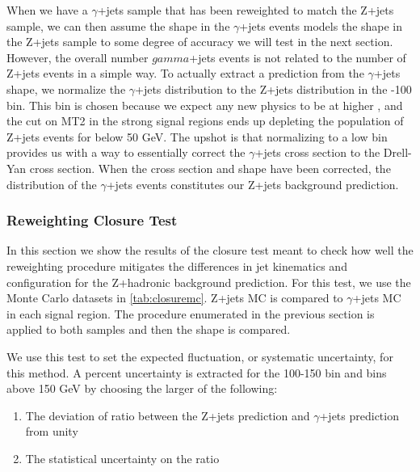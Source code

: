     When we have a $\gamma$+jets sample that has been \pt reweighted to match the Z+jets sample, we can then assume the \MET shape in the $\gamma$+jets events models the \MET shape in the Z+jets sample to some degree of accuracy we will test in the next section. However, the overall number $gamma$+jets events is not related to the number of Z+jets events in a simple way. To actually extract a prediction from the $\gamma$+jets \MET shape, we normalize the $\gamma$+jets \MET distribution to the Z+jets distribution in the -100 bin. This bin is chosen because we expect any new physics to be at higher \MET, and the cut on MT2 in the strong signal regions ends up depleting the population of Z+jets events for \MET below 50 GeV. The upshot is that normalizing to a low \MET bin provides us with a way to essentially correct the $\gamma$+jets cross section to the Drell-Yan cross section. When the cross section and \pt shape have been corrected, the \MET distribution of the $\gamma$+jets events constitutes our Z+jets background prediction.


    \subsubsection{\pt Reweighting Closure Test} \label{sec:pt_reweighting_closure_test}
      In this section we show the results of the closure test meant to check how well the \pt reweighting procedure mitigates the differences in jet kinematics and configuration for the Z+hadronic background prediction. For this test, we use the Monte Carlo datasets in \ref{tab:closuremc}.  Z+jets MC is compared to $\gamma$+jets MC in each signal region. The procedure enumerated in the previous section is applied to both samples and then the \MET shape is compared. 

      We use this test to set the expected fluctuation, or systematic uncertainty, for this method. A percent uncertainty is extracted for the 100-150 \MET bin and bins above 150 GeV by choosing the larger of the following:

      \begin{enumerate}
        \item The deviation of ratio between the Z+jets prediction and $\gamma$+jets prediction from unity

        \item The statistical uncertainty on the ratio
      \end{enumerate}     

